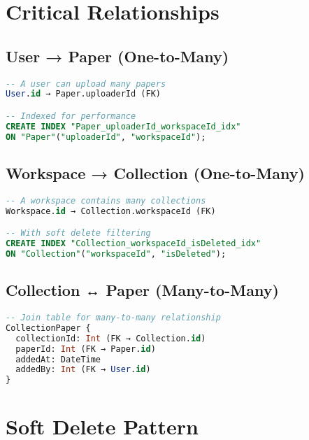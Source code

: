 \section{Critical Relationships}
\label{sec:erd-relationships}

\subsection{User → Paper (One-to-Many)}

\begin{lstlisting}[language=SQL, caption={User-Paper Relationship}]
-- A user can upload many papers
User.id → Paper.uploaderId (FK)

-- Indexed for performance
CREATE INDEX "Paper_uploaderId_workspaceId_idx" 
ON "Paper"("uploaderId", "workspaceId");
\end{lstlisting}

\subsection{Workspace → Collection (One-to-Many)}

\begin{lstlisting}[language=SQL, caption={Workspace-Collection Relationship}]
-- A workspace contains many collections
Workspace.id → Collection.workspaceId (FK)

-- With soft delete filtering
CREATE INDEX "Collection_workspaceId_isDeleted_idx" 
ON "Collection"("workspaceId", "isDeleted");
\end{lstlisting}

\subsection{Collection ↔ Paper (Many-to-Many)}

\begin{lstlisting}[language=SQL, caption={Collection-Paper Many-to-Many}]
-- Join table for many-to-many relationship
CollectionPaper {
  collectionId: Int (FK → Collection.id)
  paperId: Int (FK → Paper.id)
  addedAt: DateTime
  addedBy: Int (FK → User.id)
}
\end{lstlisting}

\section{Soft Delete Pattern}
\label{sec:erd-soft-delete}


